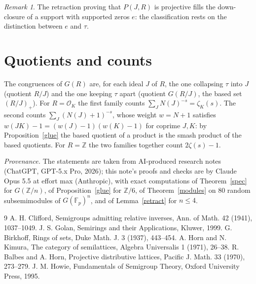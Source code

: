 \documentclass[11pt]{amsart}
\theoremstyle{remark}\newtheorem{remark}[theorem]{Remark}
\begin{document}
\begin{remark}
The retraction proving that $P(J,R)$ is projective fills the down-closure of a support with supported zeros $e$: the
classification rests on the distinction between $e$ and $\tau$.
\end{remark}

\section{Quotients and counts}
The congruences of $G(R)$ are, for each ideal $J$ of $R$, the one collapsing $\tau$ into $J$ (quotient $R/J$) and the one
keeping $\tau$ apart (quotient $G(R/J)$, the based set $(R/J)_+$). For $R=\mathcal O_K$ the first family counts
$\sum_J N(J)^{-s}=\zeta_K(s)$. The second counts $\sum_J(N(J)+1)^{-s}$, whose weight $w=N+1$ satisfies
$w(JK)-1=(w(J)-1)(w(K)-1)$ for coprime $J,K$: by Proposition~\ref{glue} the based quotient of a product is the smash
product of the based quotients. For $R=\mathbb Z$ the two families together count $2\zeta(s)-1$.

\medskip\noindent\emph{Provenance.} The statements are taken from AI-produced research notes (ChatGPT, GPT-5.x Pro,
2026); this note's proofs and checks are by Claude Opus 5.5 at effort max (Anthropic), with exact computations of
Theorem~\ref{spec} for $G(\mathbb Z/n)$, of Proposition~\ref{glue} for $\mathbb Z/6$, of Theorem~\ref{modules} on 80
random subsemimodules of $G(\mathbb F_p)^n$, and of Lemma~\ref{retract} for $n\le4$.

\begin{thebibliography}{9}
 A. H. Clifford, Semigroups admitting relative inverses, Ann. of Math. 42 (1941), 1037--1049.
 J. S. Golan, Semirings and their Applications, Kluwer, 1999.
 G. Birkhoff, Rings of sets, Duke Math. J. 3 (1937), 443--454.
 A. Horn and N. Kimura, The category of semilattices, Algebra Universalis 1 (1971), 26--38.
 R. Balbes and A. Horn, Projective distributive lattices, Pacific J. Math. 33 (1970), 273--279.
 J. M. Howie, Fundamentals of Semigroup Theory, Oxford University Press, 1995.
\end{thebibliography}
\end{document}
